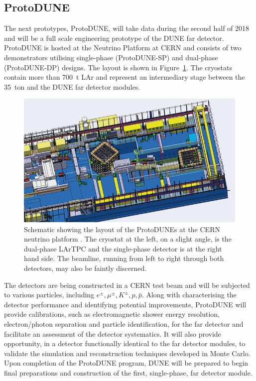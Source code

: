 \subsection{ProtoDUNE}\label{sec:ProtoDUNE}

The next prototypes, ProtoDUNE, will take data during the second half of 2018 and will be a full scale engineering prototype of the DUNE far detector.  ProtoDUNE is hosted at the Neutrino Platform at CERN and consists of two demonstrators utilising single-phase (ProtoDUNE-SP) \cite{ProtoDUNE-SP} and dual-phase (ProtoDUNE-DP) \cite{WA105} designs.  The layout is shown in Figure~\ref{fig:NeutrinoPlatform}.  The cryostats contain more than 700~t LAr and represent an intermediary stage between the 35~ton and the DUNE far detector modules.

\begin{figure}
  \centering
  \includegraphics[width=14cm]{NeutrinoPlatform.jpg}
  \caption[Schematic showing the layout of the ProtoDUNEs at the CERN neutrino platform.]{Schematic showing the layout of the ProtoDUNEs at the CERN neutrino platform \cite{NeutrinoPlatform}.  The cryostat at the left, on a slight angle, is the dual-phase LArTPC and the single-phase detector is at the right hand side.  The beamline, running from left to right through both detectors, may also be faintly discerned.}
  \label{fig:NeutrinoPlatform}
\end{figure}

The detectors are being constructed in a CERN test beam and will be subjected to various particles, including $e^{\pm}, \mu^{\pm}, K^{\pm}, p, \bar{p}$.  Along with characterising the detector performance and identifying potential improvements, ProtoDUNE will provide calibrations, such as electromagnetic shower energy resolution, electron/photon separation and particle identification, for the far detector and facilitate an assessment of the detector systematics.  It will also provide opportunity, in a detector functionally identical to the far detector modules, to validate the simulation and reconstruction techniques developed in Monte Carlo.  Upon completion of the ProtoDUNE program, DUNE will be prepared to begin final preparations and construction of the first, single-phase, far detector module.

